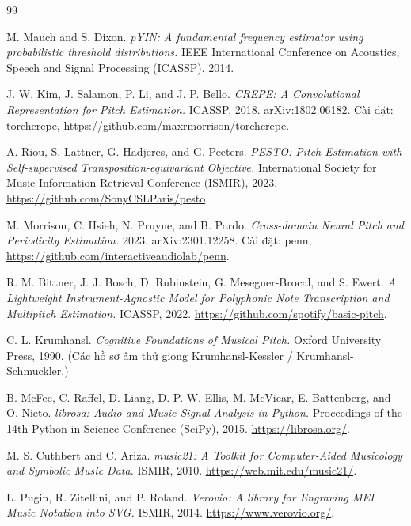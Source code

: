 \documentclass[12pt,a4paper]{article}
\begin{document}
\newpage
{}
\begin{thebibliography}{99}

 M. Mauch and S. Dixon. \emph{pYIN: A fundamental frequency
estimator using probabilistic threshold distributions.} IEEE International
Conference on Acoustics, Speech and Signal Processing (ICASSP), 2014.

 J. W. Kim, J. Salamon, P. Li, and J. P. Bello. \emph{CREPE: A
Convolutional Representation for Pitch Estimation.} ICASSP, 2018.
arXiv:1802.06182. Cài đặt: torchcrepe,
\url{https://github.com/maxrmorrison/torchcrepe}.

 A. Riou, S. Lattner, G. Hadjeres, and G. Peeters. \emph{PESTO:
Pitch Estimation with Self-supervised Transposition-equivariant Objective.}
International Society for Music Information Retrieval Conference (ISMIR), 2023.
\url{https://github.com/SonyCSLParis/pesto}.

 M. Morrison, C. Hsieh, N. Pruyne, and B. Pardo.
\emph{Cross-domain Neural Pitch and Periodicity Estimation.} 2023.
arXiv:2301.12258. Cài đặt: penn,
\url{https://github.com/interactiveaudiolab/penn}.

 R. M. Bittner, J. J. Bosch, D. Rubinstein,
G. Meseguer-Brocal, and S. Ewert. \emph{A Lightweight Instrument-Agnostic Model
for Polyphonic Note Transcription and Multipitch Estimation.} ICASSP, 2022.
\url{https://github.com/spotify/basic-pitch}.

 C. L. Krumhansl. \emph{Cognitive Foundations of Musical
Pitch.} Oxford University Press, 1990. (Các hồ sơ âm thử giọng Krumhansl-Kessler /
Krumhansl-Schmuckler.)

 B. McFee, C. Raffel, D. Liang, D. P. W. Ellis, M. McVicar,
E. Battenberg, and O. Nieto. \emph{librosa: Audio and Music Signal Analysis in
Python.} Proceedings of the 14th Python in Science Conference (SciPy), 2015.
\url{https://librosa.org/}.

 M. S. Cuthbert and C. Ariza. \emph{music21: A Toolkit for
Computer-Aided Musicology and Symbolic Music Data.} ISMIR, 2010.
\url{https://web.mit.edu/music21/}.

 L. Pugin, R. Zitellini, and P. Roland. \emph{Verovio: A
library for Engraving MEI Music Notation into SVG.} ISMIR, 2014.
\url{https://www.verovio.org/}.


\end{thebibliography}
\end{document}
